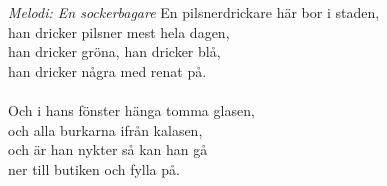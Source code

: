 {\footnotesize\textit{Melodi: En sockerbagare}}
\vspace{10pt}
En pilsnerdrickare här bor i staden,\\
han dricker pilsner mest hela dagen,\\
han dricker gröna, han dricker blå,\\
han dricker några med renat på.\\
\\
Och i hans fönster hänga tomma glasen,\\
och alla burkarna ifrån kalasen,\\
och är han nykter så kan han gå\\
ner till butiken och fylla på.
